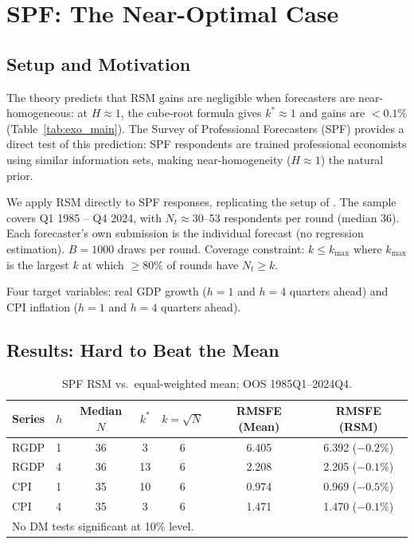 \documentclass[12pt,a4paper]{article}
\begin{document}
\section{SPF: The Near-Optimal Case}

\subsection{Setup and Motivation}

The theory predicts that RSM gains are negligible when forecasters are
near-homogeneous: at $H \approx 1$, the cube-root formula gives $k^* \approx 1$
and gains are $<0.1\%$ (Table~\ref{tab:exo_main}). The Survey of Professional
Forecasters (SPF) provides a direct test of this prediction: SPF respondents
are trained professional economists using similar information sets, making
near-homogeneity ($H \approx 1$) the natural prior.

We apply RSM directly to SPF responses, replicating the setup of
\citet{ConfittiEtAl2015}. The sample covers Q1 1985 -- Q4 2024, with
$N_t \approx 30$--53 respondents per round (median 36). Each forecaster's
own submission is the individual forecast (no regression estimation).
$B=1000$ draws per round. Coverage constraint: $k \leq k_{\max}$ where
$k_{\max}$ is the largest $k$ at which $\geq 80\%$ of rounds have $N_t \geq k$.

Four target variables: real GDP growth ($h=1$ and $h=4$ quarters ahead)
and CPI inflation ($h=1$ and $h=4$ quarters ahead).

\subsection{Results: Hard to Beat the Mean}

\begin{table}[h]
\centering
\caption{SPF RSM vs.\ equal-weighted mean; OOS 1985Q1--2024Q4.}
\label{tab:spf}
\begin{tabular}{llccccc}
\toprule
Series & $h$ & Median $N$ & $k^*$ & $k=\!\sqrt{N}$ & RMSFE (Mean) & RMSFE (RSM) \\
\midrule
RGDP & 1 & 36 & 3  & 6 & 6.405 & 6.392 ($-0.2\%$) \\
RGDP & 4 & 36 & 13 & 6 & 2.208 & 2.205 ($-0.1\%$) \\
CPI  & 1 & 35 & 10 & 6 & 0.974 & 0.969 ($-0.5\%$) \\
CPI  & 4 & 35 &  3 & 6 & 1.471 & 1.470 ($-0.1\%$) \\
\bottomrule
\multicolumn{7}{l}{\footnotesize No DM tests significant at 10\% level.}
\end{tabular}
\end{table}
\end{document}
